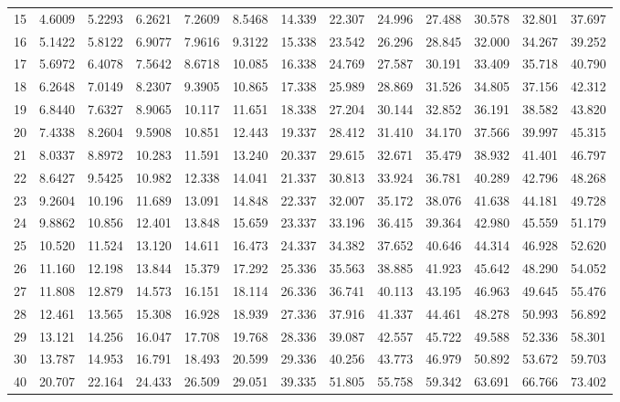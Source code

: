 \begin{table}[htbp]
\begin{tabular}{ccccccccccccc}
		15  & 4.6009 & 5.2293 & 6.2621 & 7.2609 & 8.5468 & 14.339 & 22.307 & 24.996 & 27.488 & 30.578 & 32.801 & 37.697 \\
		16  & 5.1422 & 5.8122 & 6.9077 & 7.9616 & 9.3122 & 15.338 & 23.542 & 26.296 & 28.845 & 32.000 & 34.267 & 39.252 \\
		17  & 5.6972 & 6.4078 & 7.5642 & 8.6718 & 10.085 & 16.338 & 24.769 & 27.587 & 30.191 & 33.409 & 35.718 & 40.790 \\
		18  & 6.2648 & 7.0149 & 8.2307 & 9.3905 & 10.865 & 17.338 & 25.989 & 28.869 & 31.526 & 34.805 & 37.156 & 42.312 \\
		19  & 6.8440 & 7.6327 & 8.9065 & 10.117 & 11.651 & 18.338 & 27.204 & 30.144 & 32.852 & 36.191 & 38.582 & 43.820 \\
		20  & 7.4338 & 8.2604 & 9.5908 & 10.851 & 12.443 & 19.337 & 28.412 & 31.410 & 34.170 & 37.566 & 39.997 & 45.315 \\[5pt]
		21  & 8.0337 & 8.8972 & 10.283 & 11.591 & 13.240 & 20.337 & 29.615 & 32.671 & 35.479 & 38.932 & 41.401 & 46.797 \\
		22  & 8.6427 & 9.5425 & 10.982 & 12.338 & 14.041 & 21.337 & 30.813 & 33.924 & 36.781 & 40.289 & 42.796 & 48.268 \\
		23  & 9.2604 & 10.196 & 11.689 & 13.091 & 14.848 & 22.337 & 32.007 & 35.172 & 38.076 & 41.638 & 44.181 & 49.728 \\
		24  & 9.8862 & 10.856 & 12.401 & 13.848 & 15.659 & 23.337 & 33.196 & 36.415 & 39.364 & 42.980 & 45.559 & 51.179 \\
		25  & 10.520 & 11.524 & 13.120 & 14.611 & 16.473 & 24.337 & 34.382 & 37.652 & 40.646 & 44.314 & 46.928 & 52.620 \\
		26  & 11.160 & 12.198 & 13.844 & 15.379 & 17.292 & 25.336 & 35.563 & 38.885 & 41.923 & 45.642 & 48.290 & 54.052 \\
		27  & 11.808 & 12.879 & 14.573 & 16.151 & 18.114 & 26.336 & 36.741 & 40.113 & 43.195 & 46.963 & 49.645 & 55.476 \\
		28  & 12.461 & 13.565 & 15.308 & 16.928 & 18.939 & 27.336 & 37.916 & 41.337 & 44.461 & 48.278 & 50.993 & 56.892 \\
		29  & 13.121 & 14.256 & 16.047 & 17.708 & 19.768 & 28.336 & 39.087 & 42.557 & 45.722 & 49.588 & 52.336 & 58.301 \\
		30  & 13.787 & 14.953 & 16.791 & 18.493 & 20.599 & 29.336 & 40.256 & 43.773 & 46.979 & 50.892 & 53.672 & 59.703 \\[5pt]
		40  & 20.707 & 22.164 & 24.433 & 26.509 & 29.051 & 39.335 & 51.805 & 55.758 & 59.342 & 63.691 & 66.766 & 73.402 \\

\end{tabular}
\end{table}
